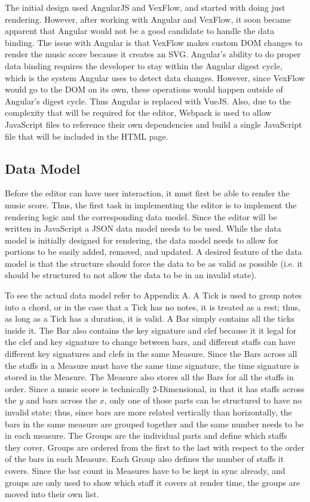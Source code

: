 \documentclass[letterpaper,12pt]{article}
\begin{document}
The initial design used AngularJS and VexFlow, and started with doing just rendering. However, after working with
Angular and VexFlow, it soon became apparent that Angular would not be a good candidate to handle the data binding. The
issue with Angular is that VexFlow makes custom DOM changes to render the music score because it creates an SVG.
Angular's ability to do proper data binding requires the developer to stay within the Angular digest cycle, which is the
system Angular uses to detect data changes. However, since VexFlow would go to the DOM on its own, these operations
would happen outside of Angular's digest cycle. Thus Angular is replaced with VueJS. Also, due to the complexity that
will be required for the editor, Webpack is used to allow JavaScript files to reference their own dependencies and build
a single JavaScript file that will be included in the HTML page.

\subsection{Data Model}

Before the editor can have user interaction, it must first be able to render the music score. Thus, the first task in
implementing the editor is to implement the rendering logic and the corresponding data model. Since the editor will be
written in JavaScript a JSON data model needs to be used. While the data model is initially designed for rendering, the
data model needs to allow for portions to be easily added, removed, and updated. A desired feature of the data model is
that the structure should force the data to be as valid as possible (i.e. it should be structured to not allow the data
to be in an invalid state).

To see the actual data model refer to Appendix A. A Tick is used to group notes into a chord, or in the case that a Tick
has no notes, it is treated as a rest; thus, as long as a Tick has a duration, it is valid. A Bar simply contains all
the ticks inside it. The Bar also contains the key signature and clef because it it legal for the clef and key signature
to change between bars, and different staffs can have different key signatures and clefs in the same Measure. Since the
Bars across all the staffs in a Measure must have the same time signature, the time signature is stored in the Measure.
The Measure also stores all the Bars for all the staffs in order. Since a music score is technically 2-Dimensional, in
that it has staffs across the $ y $ and bars across the $ x $, only one of those parts can be structured to have no
invalid state; thus, since bars are more related vertically than horizontally, the bars in the same measure are grouped
together and the same number needs to be in each measure. The Groups are the individual parts and define which staffs
they cover. Groups are ordered from the first to the last with respect to the order of the bars in each Measure. Each
Group also defines the number of staffs it covers. Since the bar count in Measures have to be kept in sync already, and
groups are only used to show which staff it covers at render time, the groups are moved into their own list.
\end{document}
